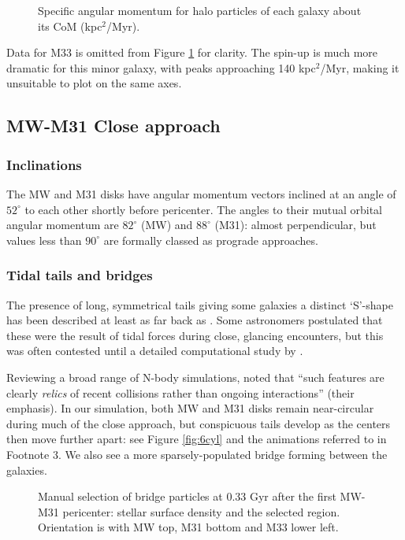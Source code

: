 \documentclass[twocolumn]{aastex63}
\begin{document}
\begin{figure}[htb!]
	\caption{Specific angular momentum for halo particles of each galaxy about its CoM (kpc$^2$/Myr).
		\label{fig:halo_h}}
\end{figure}

Data for M33 is omitted from Figure \ref{fig:halo_h} for clarity. The spin-up is much more dramatic for this minor galaxy, with peaks approaching 140 kpc$^2$/Myr, making it unsuitable to plot on the same axes.

\subsection{MW-M31 Close approach}

\subsubsection{Inclinations}

The MW and M31 disks have angular momentum vectors inclined at an angle of $52^\circ$ to each other shortly before pericenter. The angles to their mutual orbital angular momentum are $82^\circ$ (MW) and $88^\circ$ (M31): almost perpendicular, but values less than $90^\circ$ are formally classed as prograde approaches.

\subsubsection{Tidal tails and bridges}

The presence of long, symmetrical tails giving some galaxies a distinct `S'-shape has been described at least as far back as \citet{zwicky_novel_1955}. Some astronomers postulated that these were the result of tidal forces during close, glancing encounters, but this was often contested until a detailed computational study by \citet{toomre_galactic_1972}.

Reviewing a broad range of N-body simulations, \citet{barnes_dynamics_1992} noted that ``such features are clearly \textit{relics} of recent collisions rather than ongoing interactions'' (their emphasis). In our simulation, both MW and M31 disks remain near-circular during much of the close approach, but conspicuous tails develop as the centers then move further apart: see Figure \ref{fig:6cyl} and the animations referred to in Footnote 3. We also see a more sparsely-populated bridge forming between the galaxies.

\begin{figure}[ht!]
	\caption{Manual selection of bridge particles at 0.33 Gyr after the first MW-M31 pericenter: stellar surface density and the selected region. Orientation is with MW top, M31 bottom and M33 lower left. 
	\label{fig:bridge_a}}
\end{figure}
\end{document}
